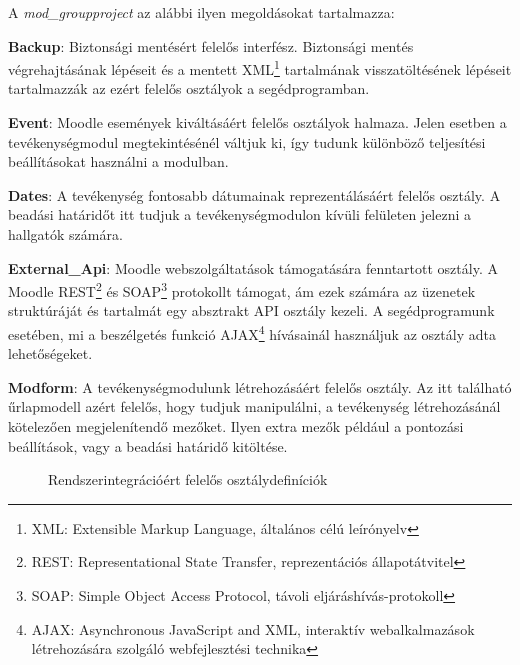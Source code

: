 A \textit{mod\_groupproject} az alábbi ilyen megoldásokat tartalmazza:
\begin{compactitem}
    \item \textbf{Backup}: Biztonsági mentésért felelős interfész. Biztonsági mentés végrehajtásának lépéseit és a mentett XML\footnote{XML: Extensible Markup Language, általános célú leírónyelv} tartalmának visszatöltésének lépéseit tartalmazzák az ezért felelős osztályok a segédprogramban. 
    \item \textbf{Event}: Moodle események kiváltásáért felelős osztályok halmaza. Jelen esetben a tevékenységmodul megtekintésénél váltjuk ki, így tudunk különböző teljesítési beállításokat használni a modulban.
    \item \textbf{Dates}: A tevékenység fontosabb dátumainak reprezentálásáért felelős osztály. A beadási határidőt itt tudjuk a tevékenységmodulon kívüli felületen jelezni a hallgatók számára. 
    \item \textbf{External\_Api}: Moodle webszolgáltatások támogatására fenntartott osztály. A Moodle REST\footnote{REST: Representational State Transfer, reprezentációs állapotátvitel} és SOAP\footnote{SOAP: Simple Object Access Protocol, távoli eljáráshívás-protokoll } protokollt támogat, ám ezek számára az üzenetek struktúráját és tartalmát egy absztrakt API osztály kezeli. A segédprogramunk esetében, mi a beszélgetés funkció AJAX\footnote{AJAX: Asynchronous JavaScript and XML, interaktív webalkalmazások létrehozására szolgáló webfejlesztési technika} hívásainál használjuk az osztály adta lehetőségeket.
    \item \textbf{Modform}: A tevékenységmodulunk létrehozásáért felelős osztály. Az itt található űrlapmodell azért felelős, hogy tudjuk manipulálni, a tevékenység létrehozásánál kötelezően megjelenítendő mezőket. Ilyen extra mezők például a pontozási beállítások, vagy a beadási határidő kitöltése.
\end{compactitem}

\begin{figure}[H]
	\caption{Rendszerintegrációért felelős osztálydefiníciók}
\end{figure}

